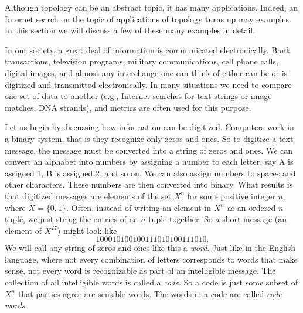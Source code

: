 \label{chap:metric_applications}


\vspace*{-17 pt}
\framebox{\hspace*{3 pt}
\parbox{4.7 in}{\begin{fqs}
\item 

\end{fqs}} \hspace*{3 pt}}

\vspace*{13 pt}

 \label{sec_top_app_intro}      %

Although topology can be an abstract topic, it has many applications. Indeed, an Internet search on the topic of applications of topology turns up may examples. In this section we will discuss a few of these many examples in detail.

\label{sec_hamming_app}

 In our society, a great deal of information is communicated electronically. Bank transactions, television programs, military communications, cell phone calls, digital images, and almost any interchange one can think of either can be or is digitized and transmitted electronically. In many situations we need to compare one set of data to another (e.g., Internet searches for text strings or image matches, DNA strands), and metrics are often used for this purpose. 
 
Let us begin by discussing how information can be digitized. Computers work in a binary system, that is they recognize only zeros and ones. So to digitize a text message, the message must be converted into a string of zeros and ones. We can convert an alphabet into numbers by assigning a number to each letter, say A is assigned 1, B is assigned 2, and so on. We can also assign numbers to spaces and other characters. These numbers are then converted into binary. What results is that digitized messages are elements of the set $X^n$ for some positive integer $n$, where $X = \{0,1\}$. Often, instead of writing an element in $X^n$ as an ordered $n$-tuple, we just string the entries of an $n$-tuple together. So a short message (an element of $X^{27}$) might look like 
\[100010100100111010100111010.\]
We will call any string of zeros and ones like this a \emph{word}. Just like in the English language, where not every combination of letters corresponds to words that make sense, not every word is recognizable as part of an intelligible message. The collection of all intelligible words is called a \emph{code}. So a code is just some subset of $X^n$ that parties agree are sensible words. The words in a code are called \emph{code words}. 

